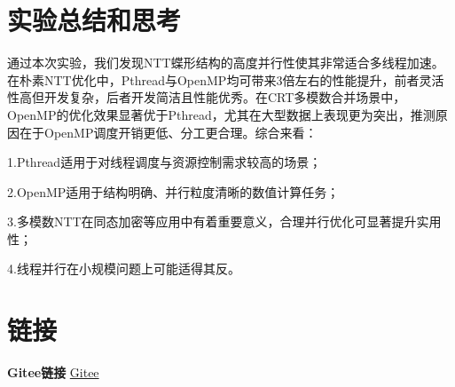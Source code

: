 \documentclass[a4paper]{article}
\begin{document}
\section{实验总结和思考}
通过本次实验，我们发现NTT蝶形结构的高度并行性使其非常适合多线程加速。在朴素NTT优化中，Pthread与OpenMP均可带来3倍左右的性能提升，前者灵活性高但开发复杂，后者开发简洁且性能优秀。在CRT多模数合并场景中，OpenMP的优化效果显著优于Pthread，尤其在大型数据上表现更为突出，推测原因在于OpenMP调度开销更低、分工更合理。综合来看：

1.Pthread适用于对线程调度与资源控制需求较高的场景；

2.OpenMP适用于结构明确、并行粒度清晰的数值计算任务；

3.多模数NTT在同态加密等应用中有着重要意义，合理并行优化可显著提升实用性；

4.线程并行在小规模问题上可能适得其反。

\section{链接}
\textbf{Gitee链接}  \href{https://gitee.com/sky_whale/parallel-programming-with-nku}{Gitee}
\end{document}
